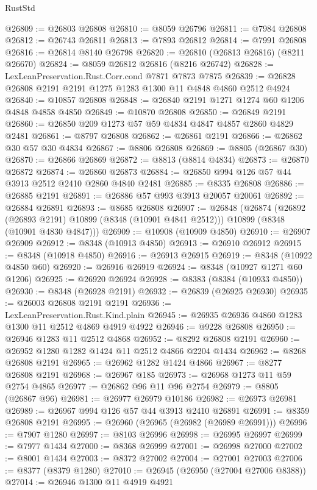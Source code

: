\begin{lexlean}{RustStd}
\begin{coremodule}
@26809 := @26803 @26808
@26810 := @8059 @26796
@26811 := @7984 @26808
@26812 := @26743 @26811
@26813 := @7893 @26812
@26814 := @7991 @26808
@26816 := @26814 @8140 @26798
@26820 := @26810 (@26813 @26816) (@8211 @26670)
@26824 := @8059 @26812 @26816 (@8216 @26742)
@26828 := LexLeanPreservation.Rust.Corr.cond @7871 @7873 @7875
@26839 := @26828 @26808 @2191 @2191 @1275 @1283 @1300 @11 @4848 @4860 @2512 @4924
@26840 := @10857 @26808
@26848 := @26840 @2191 @1271 @1274 @60 @1206 @4848 @4858 @4850
@26849 := @10870 @26808
@26850 := @26849 @2191
@26860 := @26850 @209 @1273 @57 @59 @4834 @4847 @4857 @2860 @4829 @2481
@26861 := @8797 @26808
@26862 := @26861 @2191
@26866 := @26862 @30 @57 @30 @4834
@26867 := @8806 @26808
@26869 := @8805 (@26867 @30)
@26870 := @26866 @26869
@26872 := @8813 (@8814 @4834)
@26873 := @26870 @26872
@26874 := @26860 @26873
@26884 := @26850 @994 @126 @57 @44 @3913 @2512 @2410 @2860 @4840 @2481
@26885 := @8335 @26808
@26886 := @26885 @2191
@26891 := @26886 @57 @993 @3913 @20057 @20061
@26892 := @26884 @26891
@26893 := @8685 @26808
@26907 := @26848
    (@26874
      (@26892 (@26893 @2191) @10899 (@8348 (@10901 @4841 @2512)))
      @10899
      (@8348 (@10901 @4830 @4847)))
@26909 := @10908 (@10909 @4850)
@26910 := @26907 @26909
@26912 := @8348 (@10913 @4850)
@26913 := @26910 @26912
@26915 := @8348 (@10918 @4850)
@26916 := @26913 @26915
@26919 := @8348 (@10922 @4850 @60)
@26920 := @26916 @26919
@26924 := @8348 (@10927 @1271 @60 @1206)
@26925 := @26920 @26924
@26928 := @8383 (@8384 (@10933 @4850))
@26930 := @8348 (@26928 @2191)
@26932 := @26839 (@26925 @26930)
@26935 := @26003 @26808 @2191 @2191
@26936 := LexLeanPreservation.Rust.Kind.plain
@26945 := @26935 @26936 @4860 @1283 @1300 @11 @2512 @4869 @4919 @4922
@26946 := @9228 @26808
@26950 := @26946 @1283 @11 @2512 @4868
@26952 := @8292 @26808 @2191
@26960 := @26952 @1280 @1282 @1424 @11 @2512 @4866 @2204 @1434
@26962 := @8268 @26808 @2191
@26965 := @26962 @1282 @1424 @4866
@26967 := @8277 @26808 @2191
@26968 := @26967 @185
@26973 := @26968 @1273 @11 @59 @2754 @4865
@26977 := @26862 @96 @11 @96 @2754
@26979 := @8805 (@26867 @96)
@26981 := @26977 @26979 @10186
@26982 := @26973 @26981
@26989 := @26967 @994 @126 @57 @44 @3913 @2410 @26891
@26991 := @8359 @26808 @2191
@26995 := @26960 (@26965 (@26982 (@26989 @26991)))
@26996 := @7907 @1280
@26997 := @8103 @26996
@26998 := @26995 @26997
@26999 := @7977 @1434
@27000 := @8368 @26999
@27001 := @26998 @27000
@27002 := @8001 @1434
@27003 := @8372 @27002
@27004 := @27001 @27003
@27006 := @8377 (@8379 @1280)
@27010 := @26945 (@26950 (@27004 @27006 @8388))
@27014 := @26946 @1300 @11 @4919 @4921

\end{coremodule}
\end{lexlean}
